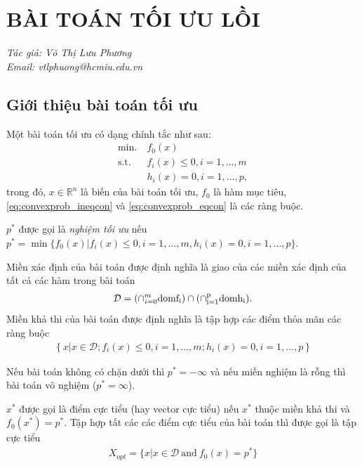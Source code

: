\documentclass{book}
\begin{document}
%
%

\setcounter{chapter}{2}
\chapter{BÀI TOÁN TỐI ƯU LỒI}
\textit{Tác giả: Võ Thị Lưu Phương\\Email: vtlphuong@hcmiu.edu.vn}


\section{Giới thiệu bài toán tối ưu}
Một bài toán tối ưu có dạng chính tắc như sau:
\begin{align}
\mathrm{min.}~ & f_0(x) \label{eq:convexprob_obj}\\
\mathrm{s.t.}~ & f_i(x) \leq 0, i = 1, \ldots, m \label{eq:convexprob_ineqcon}\\
			& h_i(x) = 0, i = 1, \ldots, p, \label{eq:convexprob_eqcon}		
\end{align}
trong đó, 
$x \in \mathbb{R}^n$ là biến của bài toán tối ưu, 
$f_0$ là hàm mục tiêu, \eqref{eq:convexprob_ineqcon} và \eqref{eq:convexprob_eqcon} là các ràng buộc.

$p^*$ được gọi là \textit{nghiệm tối ưu} nếu $p^* = \min \{f_0(x) | f_i(x) \leq 0, i = 1,\ldots,m, h_i(x) = 0, i = 1, \ldots, p\}$.

Miền xác định của bài toán được định nghĩa là giao của các miền xác định của tất cả các hàm trong bài toán
\begin{align*}
\mathcal{D} = (\cap_{i=0}^m \rm{dom} f_i) \cap (\cap_{i=1}^p \rm{dom} h_i).
\end{align*}
Miền khả thi của bài toán được định nghĩa là tập hợp các điểm thỏa mãn các ràng buộc
\begin{align*}
\left\lbrace x  | x \in \mathcal{D}; f_i(x) \leq 0, i = 1, \ldots, m; h_i(x) = 0, i = 1, \ldots, p \right\rbrace
\end{align*}

Nếu bài toán không có chặn dưới thì $p^* = -\infty$ và nếu miền nghiệm là rỗng thì bài toán vô nghiệm ($p^* = \infty$).

$x^*$ được gọi là điểm cực tiểu (hay vector cực tiểu) nếu $x^*$ thuộc miền khả thi và $f_0(x^*) = p^*$.
Tập hợp tất các các điểm cực tiểu của bài toán thì được gọi là tập cực tiểu
\begin{align*}
X_{opt} = \{ x | x \in \mathcal{D} ~ \mathrm{and} ~ f_0(x) = p^*\}
\end{align*}
\end{document}
